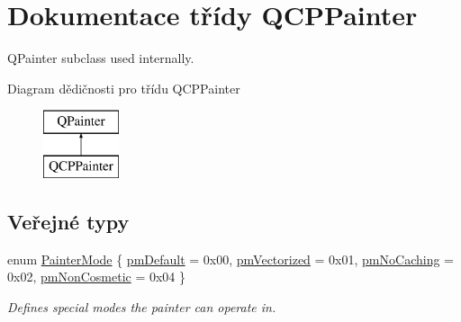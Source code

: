 \hypertarget{classQCPPainter}{}\section{Dokumentace třídy Q\+C\+P\+Painter}
\label{classQCPPainter}


Q\+Painter subclass used internally.  


Diagram dědičnosti pro třídu Q\+C\+P\+Painter\begin{figure}[H]
\begin{center}
\leavevmode
\includegraphics[height=2.000000cm]{classQCPPainter}
\end{center}
\end{figure}
\subsection*{Veřejné typy}
\begin{DoxyCompactItemize}
\item 
enum \hyperlink{classQCPPainter_a156cf16444ff5e0d81a73c615fdb156d}{Painter\+Mode} \{ \hyperlink{classQCPPainter_a156cf16444ff5e0d81a73c615fdb156da3bac5e87e3d58553b297befb4eee2a45}{pm\+Default} = 0x00, 
\hyperlink{classQCPPainter_a156cf16444ff5e0d81a73c615fdb156daeda679cd55dcd468341d07d48a30b6ab}{pm\+Vectorized} = 0x01, 
\hyperlink{classQCPPainter_a156cf16444ff5e0d81a73c615fdb156dae78f9a4eb277a5f9207f50850a51a0b0}{pm\+No\+Caching} = 0x02, 
\hyperlink{classQCPPainter_a156cf16444ff5e0d81a73c615fdb156dac1e481bfaf408f2bd2eaad3ec341f36b}{pm\+Non\+Cosmetic} = 0x04
 \}\begin{DoxyCompactList}\small\item\em Defines special modes the painter can operate in. \end{DoxyCompactList}
\end{DoxyCompactItemize}
